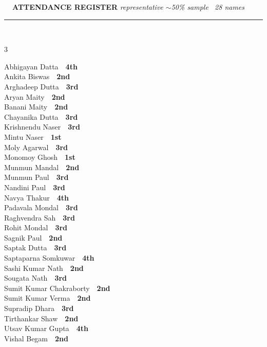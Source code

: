 \documentclass[11pt,a4paper]{article}
\begin{document}
\vspace{3pt}\noindent
{\footnotesize\bfseries\color{Slate}\faListOl~~ATTENDANCE REGISTER}%
\hfill{\scriptsize\itshape\color{Slate}representative $\sim$50\% sample \textperiodcentered\ 28 names}\\[3pt]
{\color{Line}\rule{\linewidth}{0.5pt}}\\[5pt]
\begingroup\footnotesize\setlength{\columnsep}{20pt}\setlength{\parskip}{1pt}%
\begin{multicols}{3}\raggedright
Abhigayan Datta~\dotfill~\textbf{4th}\\
Ankita Biswas~\dotfill~\textbf{2nd}\\
Arghadeep Dutta~\dotfill~\textbf{3rd}\\
Aryan Maity~\dotfill~\textbf{2nd}\\
Banani Maity~\dotfill~\textbf{2nd}\\
Chayanika Dutta~\dotfill~\textbf{3rd}\\
Krishnendu Naser~\dotfill~\textbf{3rd}\\
Mintu Naser~\dotfill~\textbf{1st}\\
Moly Agarwal~\dotfill~\textbf{3rd}\\
Monomoy Ghosh~\dotfill~\textbf{1st}\\
Munmun Mandal~\dotfill~\textbf{2nd}\\
Munmun Paul~\dotfill~\textbf{3rd}\\
Nandini Paul~\dotfill~\textbf{3rd}\\
Navya Thakur~\dotfill~\textbf{4th}\\
Padavala Mondal~\dotfill~\textbf{3rd}\\
Raghvendra Sah~\dotfill~\textbf{3rd}\\
Rohit Mondal~\dotfill~\textbf{3rd}\\
Sagnik Paul~\dotfill~\textbf{2nd}\\
Saptak Dutta~\dotfill~\textbf{3rd}\\
Saptaparna Somkuwar~\dotfill~\textbf{4th}\\
Sashi Kumar Nath~\dotfill~\textbf{2nd}\\
Sougata Nath~\dotfill~\textbf{3rd}\\
Sumit Kumar Chakraborty~\dotfill~\textbf{2nd}\\
Sumit Kumar Verma~\dotfill~\textbf{2nd}\\
Supradip Dhara~\dotfill~\textbf{3rd}\\
Tirthankar Shaw~\dotfill~\textbf{2nd}\\
Utsav Kumar Gupta~\dotfill~\textbf{4th}\\
Vishal Begam~\dotfill~\textbf{2nd}\\
\end{multicols}
\endgroup
\end{document}

